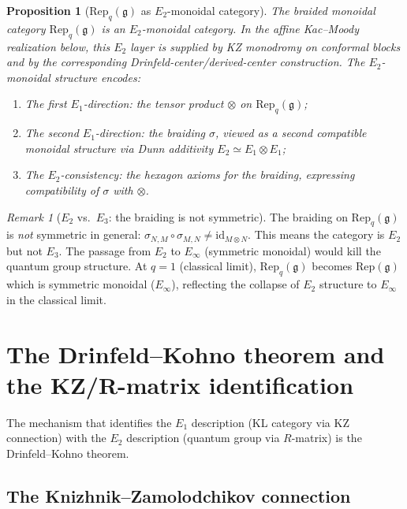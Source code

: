 \documentclass[11pt]{article}
\newtheorem{proposition}[theorem]{Proposition}
\theoremstyle{definition}
\theoremstyle{remark}
\newtheorem{remark}[theorem]{Remark}
\newcommand{\Rep}{\mathrm{Rep}}
\newcommand{\id}{\mathrm{id}}
\newcommand{\frakg}{\mathfrak{g}}
\begin{document}
\begin{proposition}[$\Rep_q(\frakg)$ as $E_2$-monoidal category]
\label{prop:rep-q-e2}
The braided monoidal category $\Rep_q(\frakg)$ is an $E_2$-monoidal
category. In the affine Kac--Moody realization below, this $E_2$ layer
is supplied by KZ monodromy on conformal blocks and by the corresponding
Drinfeld-center/derived-center construction. The $E_2$-monoidal
structure encodes:
\begin{enumerate}[label=(\roman*)]
 \item The first $E_1$-direction: the tensor product $\otimes$ on $\Rep_q(\frakg)$;
 \item The second $E_1$-direction: the braiding $\sigma$, viewed as a
 second compatible monoidal structure via Dunn additivity
 $E_2 \simeq E_1 \otimes E_1$;
 \item The $E_2$-consistency: the hexagon axioms for the braiding,
 expressing compatibility of $\sigma$ with $\otimes$.
\end{enumerate}
\end{proposition}

\begin{remark}[$E_2$ vs.\ $E_3$: the braiding is not symmetric]
The braiding on $\Rep_q(\frakg)$ is \emph{not} symmetric in general:
$\sigma_{N,M} \circ \sigma_{M,N} \ne \id_{M \otimes N}$. This means
the category is $E_2$ but not $E_3$. The passage from $E_2$ to $E_\infty$
(symmetric monoidal) would kill the quantum group structure. At $q = 1$
(classical limit), $\Rep_q(\frakg)$ becomes $\Rep(\frakg)$ which is
symmetric monoidal ($E_\infty$), reflecting the collapse of $E_2$
structure to $E_\infty$ in the classical limit.
\end{remark}

\section{The Drinfeld--Kohno theorem and the KZ/R-matrix identification}
\label{sec:drinfeld-kohno}

The mechanism that identifies the $E_1$ description (KL category via
KZ connection) with the $E_2$ description (quantum group via $R$-matrix)
is the Drinfeld--Kohno theorem.

\subsection{The Knizhnik--Zamolodchikov connection}
\label{subsec:kz-connection}
\end{document}
